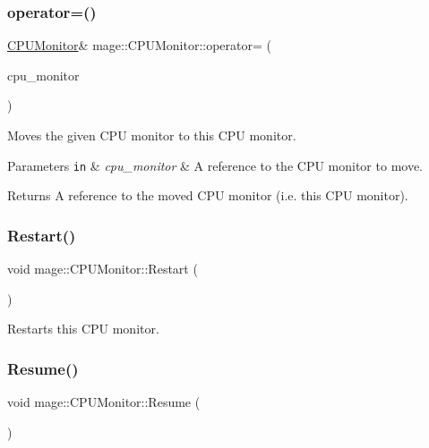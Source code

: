 \subsubsection{\texorpdfstring{operator=()}{operator=()}\hspace{0.1cm}{\footnotesize\ttfamily [2/2]}}
{\footnotesize\ttfamily \hyperlink{classmage_1_1_c_p_u_monitor}{C\+P\+U\+Monitor}\& mage\+::\+C\+P\+U\+Monitor\+::operator= (\begin{DoxyParamCaption}\item[{\hyperlink{classmage_1_1_c_p_u_monitor}{C\+P\+U\+Monitor} \&\&}]{cpu\+\_\+monitor }\end{DoxyParamCaption})\hspace{0.3cm}{\ttfamily [default]}}

Moves the given C\+PU monitor to this C\+PU monitor.


\begin{DoxyParams}[1]{Parameters}
\mbox{\tt in}  & {\em cpu\+\_\+monitor} & A reference to the C\+PU monitor to move. \\
\hline
\end{DoxyParams}
\begin{DoxyReturn}{Returns}
A reference to the moved C\+PU monitor (i.\+e. this C\+PU monitor). 
\end{DoxyReturn}
\hypertarget{classmage_1_1_c_p_u_monitor_ab8b04a64545df631be0f40a54cc49e03}{}\label{classmage_1_1_c_p_u_monitor_ab8b04a64545df631be0f40a54cc49e03} 
\subsubsection{\texorpdfstring{Restart()}{Restart()}}
{\footnotesize\ttfamily void mage\+::\+C\+P\+U\+Monitor\+::\+Restart (\begin{DoxyParamCaption}{ }\end{DoxyParamCaption})\hspace{0.3cm}{\ttfamily [noexcept]}}

Restarts this C\+PU monitor. \hypertarget{classmage_1_1_c_p_u_monitor_a5fd594262dc1073da564955c58851760}{}\label{classmage_1_1_c_p_u_monitor_a5fd594262dc1073da564955c58851760} 
\subsubsection{\texorpdfstring{Resume()}{Resume()}}
{\footnotesize\ttfamily void mage\+::\+C\+P\+U\+Monitor\+::\+Resume (\begin{DoxyParamCaption}{ }\end{DoxyParamCaption})\hspace{0.3cm}{\ttfamily [noexcept]}}

